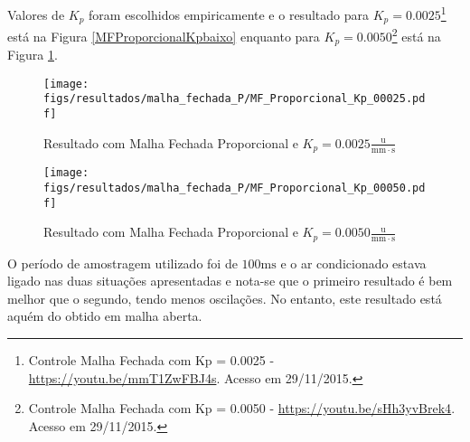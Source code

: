 Valores de $K_p$ foram escolhidos empiricamente e o resultado para $K_p = 0.0025$\footnote{Controle Malha Fechada com Kp = 0.0025 - \url{https://youtu.be/mmT1ZwFBJ4s}. Acesso em 29/11/2015.} está na Figura \ref{MFProporcionalKpbaixo} enquanto para $K_p = 0.0050$\footnote{Controle Malha Fechada com Kp = 0.0050 - \url{https://youtu.be/sHh3yvBrek4}. Acesso em 29/11/2015.} está na Figura \ref{MFProporcionalKpmedio}.


\begin{figure}[!htb]
    \centering
    \begin{minipage}{.45\textwidth}
        \centering
        \texttt{[image: figs/resultados/malha\_fechada\_P/MF\_Proporcional\_Kp\_00025.pdf]}
        \caption{Resultado com Malha Fechada Proporcional e $K_p = 0.0025\frac{\mathrm{u}}{\mathrm{mm}\cdot\mathrm{s}}$}
        \label{MFProporcionalKpbaixo}
    \end{minipage}%
    \hspace{0.1cm}
    \begin{minipage}{0.45\textwidth}
        \centering
        \texttt{[image: figs/resultados/malha\_fechada\_P/MF\_Proporcional\_Kp\_00050.pdf]}
        \caption{Resultado com Malha Fechada Proporcional e $K_p = 0.0050\frac{\mathrm{u}}{\mathrm{mm}\cdot\mathrm{s}}$
        \label{MFProporcionalKpmedio}}
    \end{minipage}
\end{figure}

O período de amostragem utilizado foi de $100\mathrm{ms}$ e o ar condicionado estava ligado nas duas situações apresentadas e nota-se que o primeiro resultado é bem melhor que o segundo, tendo menos oscilações. No entanto, este resultado está aquém do obtido em malha aberta.

